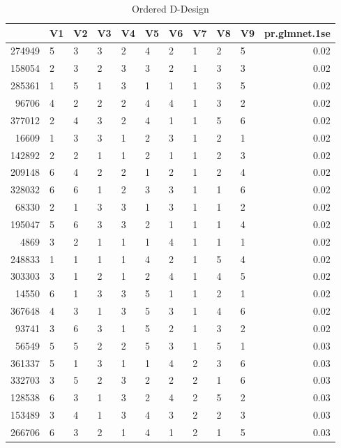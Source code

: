 \begin{table}[ht]
\centering
\caption{Ordered D-Design} 
\label{tab:ordered_d_design}
\begin{tabular}{rlllllllllr}
  \hline
 & V1 & V2 & V3 & V4 & V5 & V6 & V7 & V8 & V9 & pr.glmnet.1se \\ 
  \hline
274949 & 5 & 3 & 3 & 2 & 4 & 2 & 1 & 2 & 5 & 0.02 \\ 
  158054 & 2 & 3 & 2 & 3 & 3 & 2 & 1 & 3 & 3 & 0.02 \\ 
  285361 & 1 & 5 & 1 & 3 & 1 & 1 & 1 & 3 & 5 & 0.02 \\ 
  96706 & 4 & 2 & 2 & 2 & 4 & 4 & 1 & 3 & 2 & 0.02 \\ 
  377012 & 2 & 4 & 3 & 2 & 4 & 1 & 1 & 5 & 6 & 0.02 \\ 
  16609 & 1 & 3 & 3 & 1 & 2 & 3 & 1 & 2 & 1 & 0.02 \\ 
  142892 & 2 & 2 & 1 & 1 & 2 & 1 & 1 & 2 & 3 & 0.02 \\ 
  209148 & 6 & 4 & 2 & 2 & 1 & 2 & 1 & 2 & 4 & 0.02 \\ 
  328032 & 6 & 6 & 1 & 2 & 3 & 3 & 1 & 1 & 6 & 0.02 \\ 
  68330 & 2 & 1 & 3 & 3 & 1 & 3 & 1 & 1 & 2 & 0.02 \\ 
  195047 & 5 & 6 & 3 & 3 & 2 & 1 & 1 & 1 & 4 & 0.02 \\ 
  4869 & 3 & 2 & 1 & 1 & 1 & 4 & 1 & 1 & 1 & 0.02 \\ 
  248833 & 1 & 1 & 1 & 1 & 4 & 2 & 1 & 5 & 4 & 0.02 \\ 
  303303 & 3 & 1 & 2 & 1 & 2 & 4 & 1 & 4 & 5 & 0.02 \\ 
  14550 & 6 & 1 & 3 & 3 & 5 & 1 & 1 & 2 & 1 & 0.02 \\ 
  367648 & 4 & 3 & 1 & 3 & 5 & 3 & 1 & 4 & 6 & 0.02 \\ 
  93741 & 3 & 6 & 3 & 1 & 5 & 2 & 1 & 3 & 2 & 0.02 \\ 
  56549 & 5 & 5 & 2 & 2 & 5 & 3 & 1 & 5 & 1 & 0.03 \\ 
  361337 & 5 & 1 & 3 & 1 & 1 & 4 & 2 & 3 & 6 & 0.03 \\ 
  332703 & 3 & 5 & 2 & 3 & 2 & 2 & 2 & 1 & 6 & 0.03 \\ 
  128538 & 6 & 3 & 1 & 3 & 2 & 4 & 2 & 5 & 2 & 0.03 \\ 
  153489 & 3 & 4 & 1 & 3 & 4 & 3 & 2 & 2 & 3 & 0.03 \\ 
  266706 & 6 & 3 & 2 & 1 & 4 & 1 & 2 & 1 & 5 & 0.03 \\ 

\end{tabular}
\end{table}
